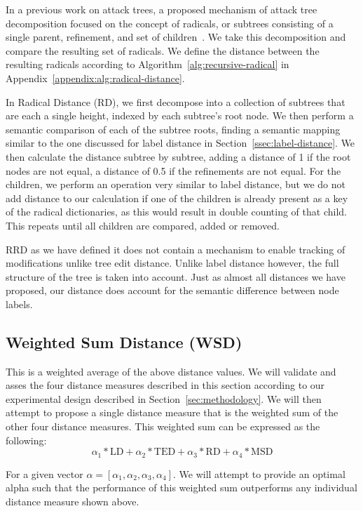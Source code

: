 In a previous work on attack trees, a proposed mechanism of attack tree decomposition focused on the concept of radicals, or subtrees consisting of a single parent, refinement, and set of children~\cite{schiele2021novel}. We take this decomposition and compare the resulting set of radicals. We define the distance between the resulting radicals according to Algorithm~\ref{alg:recursive-radical} in Appendix~\ref{appendix:alg:radical-distance}.

In Radical Distance (RD), we first decompose into a collection of subtrees that are each a single height, indexed by each subtree's root node. We then perform a semantic comparison of each of the subtree roots, finding a semantic mapping similar to the one discussed for label distance in Section~\ref{ssec:label-distance}. We then calculate the distance subtree by subtree, adding a distance of 1 if the root nodes are not equal, a distance of 0.5 if the refinements are not equal. For the children, we perform an operation very similar to label distance, but we do not add distance to our calculation if one of the children is already present as a key of the radical dictionaries, as this would result in double counting of that child. This repeats until all children are compared, added or removed.

RRD as we have defined it does not contain a mechanism to enable tracking of modifications unlike tree edit distance. Unlike label distance however, the full structure of the tree is taken into account. Just as almost all distances we have proposed, our distance does account for the semantic difference between node labels.




\subsection{Weighted Sum Distance (WSD)}
\label{ssec:wsd}

This is a weighted average of the above distance values. We will validate and asses the four distance measures described in this section according to our experimental design described in Section~\ref{sec:methodology}. We will then attempt to propose a single distance measure that is the weighted sum of the other four distance measures. This weighted sum can be expressed as the following:
\[
    \alpha_1*\text{LD}+ \alpha_2*\text{TED} + \alpha_3*\text{RD} + \alpha_4*\text{MSD}
\]

For a given vector $\alpha = [\alpha_1, \alpha_2, \alpha_3, \alpha_4]$. We will attempt to provide an optimal alpha such that the performance of this weighted sum outperforms any individual distance measure shown above.






